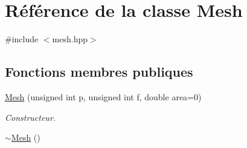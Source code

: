 \hypertarget{class_mesh}{\section{Référence de la classe Mesh}
\label{class_mesh}
}


{\ttfamily \#include $<$mesh.\-hpp$>$}

\subsection*{Fonctions membres publiques}
\begin{DoxyCompactItemize}
\item 
\hyperlink{class_mesh_a48da2d867d5d49da54668faba1a7435a}{Mesh} (unsigned int p, unsigned int f, double area=0)
\begin{DoxyCompactList}\small\item\em Constructeur. \end{DoxyCompactList}\item 
\hypertarget{class_mesh_a5efe4da1a4c0971cfb037bd70304c303}{\hyperlink{class_mesh_a5efe4da1a4c0971cfb037bd70304c303}{$\sim$\-Mesh} ()}\label{class_mesh_a5efe4da1a4c0971cfb037bd70304c303}


\end{DoxyCompactItemize}
